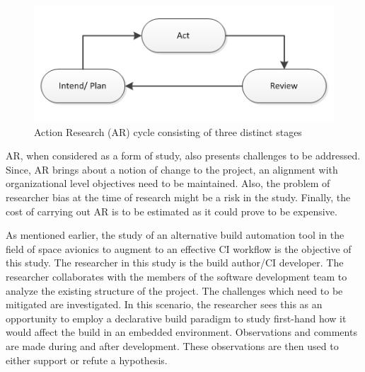 \documentclass[12pt, a4paper, titlepage]{scrartcl}
\begin{document}
\begin{figure}[!ht]
\centering
\caption{Action Research (AR) cycle consisting of three distinct stages}
\label{fig:ar-cycle}
\includegraphics[scale=0.99]{AR.png}
\end{figure}

\par AR, when considered as a form of study, also presents challenges to be addressed. Since, AR brings about a notion of change to the project, an alignment with organizational level objectives need to be maintained. Also, the problem of researcher bias at the time of research might be a risk in the study. Finally, the cost of carrying out AR is to be estimated as it could prove to be expensive\cite{easterbrook2008selecting}. 
\par As mentioned earlier, the study of an alternative build automation tool in the field of space avionics to augment to an effective CI workflow is the objective of this study. The researcher in this study is the build author/CI developer. The researcher collaborates with the  members of the software development team to analyze the existing structure of the project. The challenges which need to be mitigated are investigated. In this scenario, the researcher sees this as an opportunity to employ a declarative build paradigm to study first-hand how it would affect the build in an embedded environment. Observations and comments are made during and after development. These observations are then used to either support or refute a hypothesis. 
\end{document}
